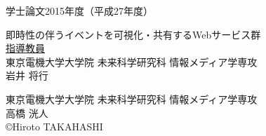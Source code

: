 \pagestyle{empty}
\begin{center}

\LARGE{学士論文\hspace{10mm}2015年度（平成27年度）}\\

\vspace{19mm}

\huge{即時性の伴うイベントを可視化・共有するWebサービス群}\\
\vspace{60mm}
\large{\underline{指導教員}}\\
\large{東京電機大学大学院 未来科学研究科 情報メディア学専攻}\\
\Large{岩井 将行}\\

\vspace{40mm}

\large{東京電機大学大学院 未来科学研究科 情報メディア学専攻}\\
\LARGE{高橋 洸人}\\
\large{\copyright Hiroto TAKAHASHI}\\
\end{center}
